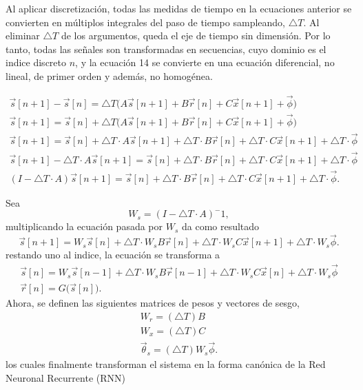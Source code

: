 \documentclass[12pt,letterpaper]{article}
\begin{document}
Al aplicar discretización, todas las medidas de tiempo en la ecuaciones anterior se convierten en múltiplos integrales del paso de tiempo sampleando, $\triangle T$. Al eliminar $\triangle T$ de los argumentos, queda el eje de tiempo sin dimensión. Por lo tanto, todas las señales son transformadas en secuencias, cuyo dominio es el indice discreto $n$, y la ecuación 14 se convierte en una ecuación diferencial, no lineal, de primer orden y además, no homogénea. \cite{sherstinsky2020fundamentals}

\begingroup
\small
\begin{gather}
    \vec{s}[n+1] - \vec{s}[n]=\triangle T\bigg( A\vec{s}[n+1] + B\vec{r}[n] + C \vec{x}[n+1] + \vec{\phi}\bigg)\\
    \vec{s}[n+1]=\vec{s}[n]+\triangle T\bigg( A\vec{s}[n+1]+B \vec{r}[n]+C\vec{x}[n+1]+\vec{\phi} \bigg)\\
    \vec{s}[n+1]=\vec{s}[n]+\triangle T\cdot A\vec{s}[n+1]+\triangle T\cdot B \vec{r}[n]+ \triangle T\cdot C\vec{x}[n+1]+ \triangle T\cdot \vec{\phi}\\
    \vec{s}[n+1]-\triangle T\cdot A\vec{s}[n+1] = \vec{s}[n]+\triangle T\cdot B \vec{r}[n]+ \triangle T\cdot C\vec{x}[n+1]+ \triangle T\cdot \vec{\phi}\\
    (I-\triangle T \cdot A)\vec{s}[n+1]= \vec{s}[n]+\triangle T\cdot B \vec{r}[n]+ \triangle T\cdot C\vec{x}[n+1]+ \triangle T\cdot \vec{\phi}.
\end{gather}
\endgroup


Sea
\begin{equation}
    W_s=(I-\triangle T \cdot A)^-1,
\end{equation}
multiplicando la ecuación pasada por $W_s$ da como resultado
\begin{equation}
    \vec{s}[n+1]=W_s\vec{s}[n]+\triangle T\cdot W_s B \vec{r}[n]+ \triangle T\cdot W_s C\vec{x}[n+1]+ \triangle T\cdot W_s \vec{\phi}.
\end{equation}
restando uno al indice, la ecuación se transforma a
\begin{gather}
    \vec{s}[n]=W_s\vec{s}[n-1]+\triangle T\cdot W_s B \vec{r}[n-1]+ \triangle T\cdot W_s C\vec{x}[n]+ \triangle T\cdot W_s \vec{\phi}\\
    \vec{r}[n]= G\big(\vec{s}[n] \big).
\end{gather}
Ahora, se definen las siguientes matrices de pesos y vectores de sesgo,
\begin{gather}
    W_r=(\triangle T)B\\
    W_x=(\triangle T)C \\
    \vec{\theta}_s=(\triangle T)W_s\vec{\phi}.
\end{gather}
los cuales finalmente transforman el sistema en la forma canónica de la Red Neuronal Recurrente (RNN)
\end{document}
